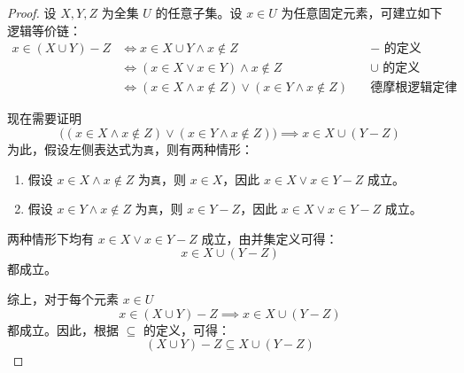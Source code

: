 \begin{proof}
    设 $X, Y, Z$ 为全集 $U$ 的任意子集。设 $x \in U$ 为任意固定元素，可建立如下逻辑等价链：
    \begin{align*}
        x \in (X \cup Y ) - Z &\iff x \in X \cup Y \land x \notin Z &\quad - \text{\ 的定义}\\
        &\iff (x \in X \lor x \in Y ) \land x \notin Z &\quad \cup \text{\ 的定义} \\
        &\iff (x \in X \land x \notin Z) \lor (x \in Y \land x \notin Z) &\quad \text{德摩根逻辑定律} 
    \end{align*}

    \setlength{\fboxrule}{2pt}
    \setlength\fboxsep{5mm}
    \begin{center}
    \end{center}
    现在需要证明
    \[\big((x \in X \land x \notin Z) \lor (x \in Y \land x \notin Z)\big) \implies x \in X \cup (Y - Z)\]
    为此，假设左侧表达式为\verb|真|，则有两种情形：
    \begin{enumerate}
        \item 假设 $x \in X \land x \notin Z$ 为\verb|真|，则 $x \in X$，因此 $x \in X \lor x \in Y - Z$ 成立。
        \item 假设 $x \in Y \land x \notin Z$ 为\verb|真|，则 $x \in Y - Z$，因此 $x \in X \lor x \in Y - Z$ 成立。
    \end{enumerate}
    两种情形下均有 $x \in X \lor x \in Y - Z$ 成立，由并集定义可得：
    \[x \in X \cup (Y - Z)\]
    都成立。

    综上，对于每个元素 $x \in U$ 
    \[x \in (X \cup Y ) - Z \implies x \in X \cup (Y - Z)\]
    都成立。因此，根据 $\subseteq$ 的定义，可得：
    \[(X \cup Y ) - Z \subseteq X \cup (Y - Z)\]
\end{proof}

